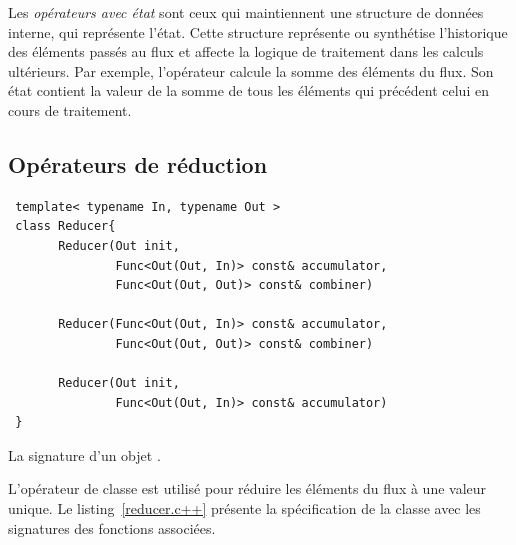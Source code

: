 Les \emph{op\'erateurs avec \'etat} sont ceux qui maintiennent une structure de donn\'ees interne, qui repr\'esente l'\'etat. Cette structure repr\'esente ou synth\'etise l'historique des \'el\'ements pass\'es au flux et affecte la logique de traitement dans les calculs ult\'erieurs. Par exemple, l'op\'erateur  calcule la somme des \'el\'ements du flux. Son \'etat contient la valeur de la somme de tous les \'el\'ements qui pr\'ec\'edent celui en cours de traitement. 

\subsection*{Op\'erateurs de r\'eduction}

\label{reducer.sect}

\begin{Listing}[tbp]
\begin{lstlisting}
 template< typename In, typename Out >
 class Reducer{
       Reducer(Out init, 
               Func<Out(Out, In)> const& accumulator,
               Func<Out(Out, Out)> const& combiner)

       Reducer(Func<Out(Out, In)> const& accumulator,
               Func<Out(Out, Out)> const& combiner)

       Reducer(Out init, 
               Func<Out(Out, In)> const& accumulator)
 }
\end{lstlisting}
\caption{La signature d'un objet .}
\label{reducer.c++}
\end{Listing}



L'op\'erateur de classe  est utilis\'e pour r\'eduire les \'el\'ements du flux \`a une valeur unique. Le listing~\ref{reducer.c++} présente la spécification  de la classe  avec les signatures des fonctions associées. 

